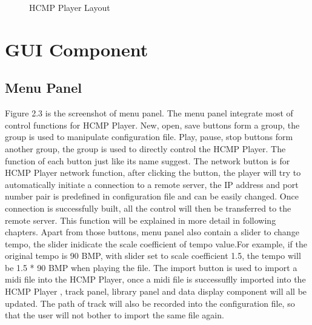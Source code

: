 \begin{figure}[H]
\caption{HCMP Player Layout}
\label{fig:speciation}
\end{figure}

\section{GUI Component}

\subsection{Menu Panel}

Figure 2.3 is the screenshot of menu panel. The menu panel integrate most of control 
functions for HCMP Player. New, open, save buttons form a group, the group is used to 
manipulate configuration file. Play, pause, stop buttons form another group, 
the group is used to directly control the HCMP Player. 
The function of each button just like its name suggest. The network button 
is for HCMP Player  
network function, after clicking the button, the player will try to automatically 
initiate a connection to a remote server, the IP address and port number pair is 
predefined in configuration file and can be easily changed. Once connection is 
successfully built, all the control will then be transferred to the remote server. 
This function will be explained in more detail in following
chapters. Apart from those buttons, menu panel also contain a slider to change 
tempo, the slider inidicate the scale coefficient of tempo value.For example, if the original tempo is 90 BMP, with slider set to scale coefficient 1.5, the tempo will be 1.5 * 90 
BMP when playing the file. The import button is used to import a midi file 
into the HCMP Player, once a midi file is successuflly imported into the HCMP Player  
, track panel, library panel and data display component will all be updated. 
The path of track will also be recorded into the configuration file, so that the user 
will not bother to import the same file again.

